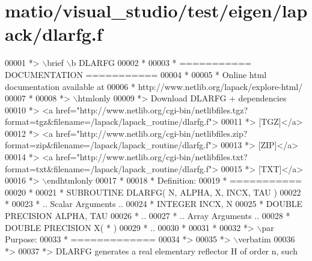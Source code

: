 \hypertarget{matio_2visual__studio_2test_2eigen_2lapack_2dlarfg_8f_source}{}\section{matio/visual\+\_\+studio/test/eigen/lapack/dlarfg.f}
\label{matio_2visual__studio_2test_2eigen_2lapack_2dlarfg_8f_source}

\begin{DoxyCode}
00001 \textcolor{comment}{*> \(\backslash\)brief \(\backslash\)b DLARFG}
00002 \textcolor{comment}{*}
00003 \textcolor{comment}{*  =========== DOCUMENTATION ===========}
00004 \textcolor{comment}{*}
00005 \textcolor{comment}{* Online html documentation available at }
00006 \textcolor{comment}{*            http://www.netlib.org/lapack/explore-html/ }
00007 \textcolor{comment}{*}
00008 \textcolor{comment}{*> \(\backslash\)htmlonly}
00009 \textcolor{comment}{*> Download DLARFG + dependencies }
00010 \textcolor{comment}{*> <a
       href="http://www.netlib.org/cgi-bin/netlibfiles.tgz?format=tgz&filename=/lapack/lapack\_routine/dlarfg.f"> }
00011 \textcolor{comment}{*> [TGZ]</a> }
00012 \textcolor{comment}{*> <a
       href="http://www.netlib.org/cgi-bin/netlibfiles.zip?format=zip&filename=/lapack/lapack\_routine/dlarfg.f"> }
00013 \textcolor{comment}{*> [ZIP]</a> }
00014 \textcolor{comment}{*> <a
       href="http://www.netlib.org/cgi-bin/netlibfiles.txt?format=txt&filename=/lapack/lapack\_routine/dlarfg.f"> }
00015 \textcolor{comment}{*> [TXT]</a>}
00016 \textcolor{comment}{*> \(\backslash\)endhtmlonly }
00017 \textcolor{comment}{*}
00018 \textcolor{comment}{*  Definition:}
00019 \textcolor{comment}{*  ===========}
00020 \textcolor{comment}{*}
00021 \textcolor{comment}{*       SUBROUTINE DLARFG( N, ALPHA, X, INCX, TAU )}
00022 \textcolor{comment}{* }
00023 \textcolor{comment}{*       .. Scalar Arguments ..}
00024 \textcolor{comment}{*       INTEGER            INCX, N}
00025 \textcolor{comment}{*       DOUBLE PRECISION   ALPHA, TAU}
00026 \textcolor{comment}{*       ..}
00027 \textcolor{comment}{*       .. Array Arguments ..}
00028 \textcolor{comment}{*       DOUBLE PRECISION   X( * )}
00029 \textcolor{comment}{*       ..}
00030 \textcolor{comment}{*  }
00031 \textcolor{comment}{*}
00032 \textcolor{comment}{*> \(\backslash\)par Purpose:}
00033 \textcolor{comment}{*  =============}
00034 \textcolor{comment}{*>}
00035 \textcolor{comment}{*> \(\backslash\)verbatim}
00036 \textcolor{comment}{*>}
00037 \textcolor{comment}{*> DLARFG generates a real elementary reflector H of order n, such}

\end{DoxyCode}
